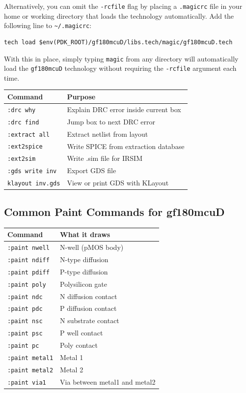 \documentclass[11pt]{article}
\begin{document}
\noindent Alternatively, you can omit the \texttt{-rcfile} flag by placing a
\texttt{.magicrc} file in your home or working directory that loads the
technology automatically. Add the following line to \texttt{\textasciitilde/.magicrc}:
\begin{lstlisting}
tech load $env(PDK_ROOT)/gf180mcuD/libs.tech/magic/gf180mcuD.tech
\end{lstlisting}
\noindent With this in place, simply typing \texttt{magic} from any directory
will automatically load the \texttt{gf180mcuD} technology without requiring
the \texttt{-rcfile} argument each time.

\begin{center}
\begin{tabular}{@{}lp{7.5cm}@{}}
\toprule
\textbf{Command} & \textbf{Purpose} \\
\midrule
\texttt{:drc why}        & Explain DRC error inside current box \\
\texttt{:drc find}       & Jump box to next DRC error \\
\texttt{:extract all}    & Extract netlist from layout \\
\texttt{:ext2spice}      & Write SPICE from extraction database \\
\texttt{:ext2sim}        & Write .sim file for IRSIM \\
\texttt{:gds write inv}  & Export GDS file \\
\texttt{klayout inv.gds} & View or print GDS with KLayout \\
\bottomrule
\end{tabular}
\end{center}

\subsection*{Common Paint Commands for gf180mcuD}

\begin{center}
\begin{tabular}{@{}ll@{}}
\toprule
\textbf{Command} & \textbf{What it draws} \\
\midrule
\texttt{:paint nwell}  & N-well (pMOS body) \\
\texttt{:paint ndiff}  & N-type diffusion \\
\texttt{:paint pdiff}  & P-type diffusion \\
\texttt{:paint poly}   & Polysilicon gate \\
\texttt{:paint ndc}    & N diffusion contact \\
\texttt{:paint pdc}    & P diffusion contact \\
\texttt{:paint nsc}    & N substrate contact \\
\texttt{:paint psc}    & P well contact \\
\texttt{:paint pc}     & Poly contact \\
\texttt{:paint metal1} & Metal 1 \\
\texttt{:paint metal2} & Metal 2 \\
\texttt{:paint via1}   & Via between metal1 and metal2 \\
\bottomrule
\end{tabular}
\end{center}
\end{document}
